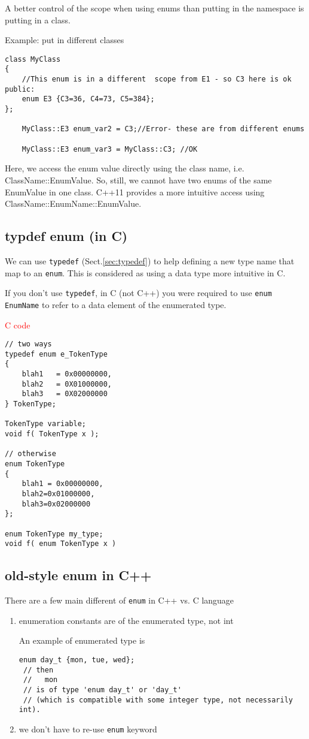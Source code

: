 A better control of the scope when using enums than putting in the namespace is
putting in a class.

Example: put in different classes
\begin{verbatim}
class MyClass
{
    //This enum is in a different  scope from E1 - so C3 here is ok
public:
    enum E3 {C3=36, C4=73, C5=384};
};

    MyClass::E3 enum_var2 = C3;//Error- these are from different enums 

    MyClass::E3 enum_var3 = MyClass::C3; //OK
\end{verbatim}

Here, we access the enum value directly using the class name, i.e.
ClassName::EnumValue. So, still, we cannot have two enums of the same
EnumValue in one class. C++11 provides a more intuitive access using
ClassName::EnumName::EnumValue.

\subsection{typdef enum (in C)}
\label{sec:enum-typedef-C}
\label{sec:typedef-enum-C}

We can use \verb!typedef! (Sect.\ref{sec:typedef}) to help defining a new
type name that map to an \verb!enum!. This is considered as using a data type
more intuitive in C.

If you don't use \verb!typedef!, in C (not C++) you were required to use
\verb!enum EnumName! to refer to a data element of the enumerated type.

\textcolor{red}{C code}
\begin{lstlisting}
// two ways
typedef enum e_TokenType
{
    blah1   = 0x00000000,
    blah2   = 0X01000000,
    blah3   = 0X02000000
} TokenType;

TokenType variable;
void f( TokenType x );

// otherwise
enum TokenType
{
    blah1 = 0x00000000,
    blah2=0x01000000,
    blah3=0x02000000
};

enum TokenType my_type;
void f( enum TokenType x )
\end{lstlisting}

\subsection{old-style enum in C++}
\label{sec:enum-C++}

There are a few main different of \verb!enum! in C++ vs. C language
\begin{enumerate}
  \item enumeration constants are of the enumerated type, not int
  
  An example of enumerated type is 
\begin{verbatim}
enum day_t {mon, tue, wed};
 // then 
 //   mon
 // is of type 'enum day_t' or 'day_t'   
 // (which is compatible with some integer type, not necessarily int).
\end{verbatim}
  
  \item we don't have to re-use \verb!enum! keyword
\end{enumerate}

